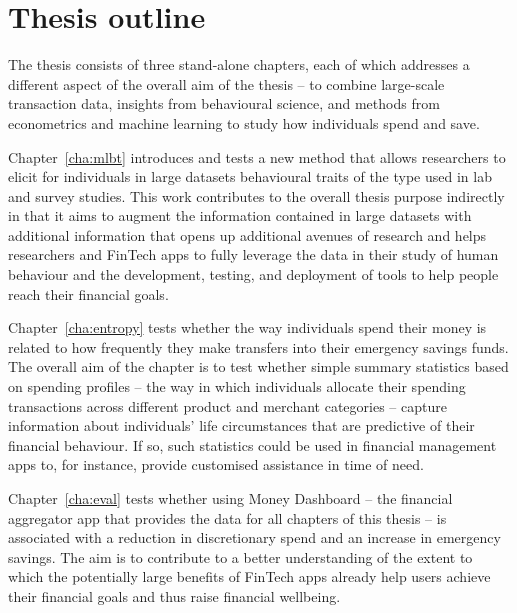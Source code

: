 \section{Thesis outline}%

The thesis consists of three stand-alone chapters, each of which addresses a
different aspect of the overall aim of the thesis -- to combine large-scale
transaction data, insights from behavioural science, and methods from
econometrics and machine learning to study how individuals spend and save. 

Chapter~\ref{cha:mlbt} introduces and tests a new method that allows
researchers to elicit for individuals in large datasets behavioural traits of the type used in lab and survey
studies. This work contributes to the overall
thesis purpose indirectly in that it aims to augment the information contained
in large datasets with additional information that opens up additional avenues
of research and helps researchers and FinTech apps to fully leverage the data in their study of
human behaviour and the development, testing, and deployment of tools to help people reach their financial goals.

Chapter~\ref{cha:entropy} tests whether the way individuals spend their money
is related to how frequently they make transfers into their emergency savings
funds. The overall aim of the chapter is to test whether simple summary
statistics based on spending profiles -- the way in which individuals
allocate their spending transactions across different product and merchant
categories -- capture information about individuals' life circumstances that
are predictive of their financial behaviour. If so, such statistics could be
used in financial management apps to, for instance, provide customised assistance in time of need.

Chapter~\ref{cha:eval} tests whether using Money Dashboard -- the financial
aggregator app that provides the data for all chapters of this thesis -- is
associated with a reduction in discretionary spend and an increase in emergency
savings. The aim is to contribute to a better understanding of the extent to
which the potentially large benefits of FinTech apps already help users achieve
their financial goals and thus raise financial wellbeing.
